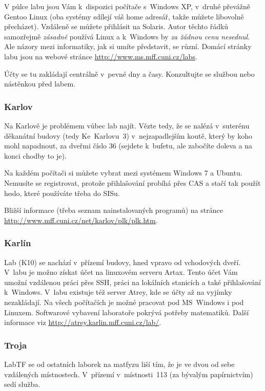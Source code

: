 V půlce labu jsou Vám k~dispozici počítače s~Windows XP, v~druhé převážně Gentoo Linux (oba systémy sdílejí váš home adresář, takže můžete li\-bo\-vol\-ně pře\-chá\-zet). Vzdá\-le\-ně se můžete přihlásit na Solaris. Autor těchto řádků samozřejmě {\it zásadně} používá Linux a k~Windows by {\it za žádnou cenu nesednul}. Ale názory mezi informatiky, jak si umíte představit, se různí. Domácí stránky labu jsou na webové stránce \url{http://www.ms.mff.cuni.cz/labs}.

Účty se tu zakládají centrálně v~pevné dny a časy. Konzultujte se
službou nebo nástěnkou před labem.

\subsubsection{Karlov}

Na Karlově je problémem vůbec lab najít. Vězte tedy, že se nalézá
v~suterénu děkanátní budovy (tedy Ke~Karlovu~3) v~nejzapadlejším koutě,
který by koho mohl napadnout, za dveřmi číslo 36 (sejdete
k~bufetu, ale zabočíte doleva a na konci chodby to je). 

Na každém počítači si můžete vybrat mezi systémem Windows 7 a Ubuntu. Nemusíte se registrovat, protože přihlašování probíhá přes CAS a stačí tak použít heslo, které používáte třeba do SISu.

Bližší informace (třeba seznam nainstalovaných programů) na stránce \url{http://www.mff.cuni.cz/net/karlov/plk/plk.htm}.

\subsubsection{Karlín}

Lab (K10) se nachází v~přízemí budovy, hned vpravo od vchodových
dveří. V~labu je možno získat účet na linuxovém serveru Artax.
Tento účet Vám umožní vzdálenou práci přes SSH, práci na lokálních
stanicích a také přihlašování k~Windows. V~labu existuje též
server Atrey, kde se účty až na vyjímky nezakládají. Na všech
počítačích je možné pracovat pod MS~Windows i pod Linuxem.
Softwarové vybavení laboratoře pokrývá potřeby matematiků. Další
informace viz \url{http://atrey.karlin.mff.cuni.cz/lab/}.

\subsubsection{Troja}

LabTF se od ostatních laborek na matfyzu liší tím, že je ve dvou od
sebe vzdálených místnostech.  V~přízemí v~místnosti~113 (za
bývalým papírnictvím) sedí služba.

